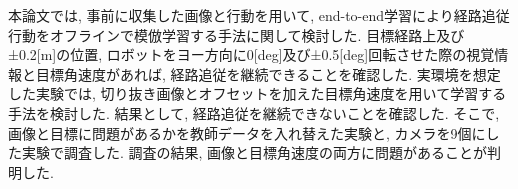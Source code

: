 
本論文では, 事前に収集した画像と行動を用いて, end-to-end学習により経路追従行動をオフラインで模倣学習する手法に関して検討した. 目標経路上及び±0.2[m]の位置, ロボットをヨー方向に0[deg]及び±0.5[deg]回転させた際の視覚情報と目標角速度があれば, 経路追従を継続できることを確認した. 実環境を想定した実験では, 切り抜き画像とオフセットを加えた目標角速度を用いて学習する手法を検討した. 結果として, 経路追従を継続できないことを確認した. そこで, 画像と目標に問題があるかを教師データを入れ替えた実験と, カメラを9個にした実験で調査した. 調査の結果, 画像と目標角速度の両方に問題があることが判明した. 